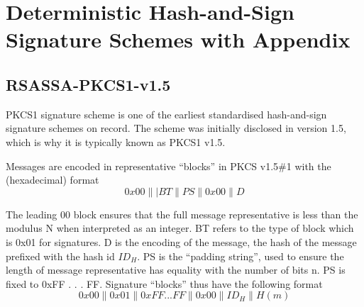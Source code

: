 \documentclass[]{final_report}
\theoremstyle{definition}
\begin{document}
\section{Deterministic Hash-and-Sign Signature Schemes with Appendix}

\subsection{RSASSA-PKCS1-v1.5}
PKCS1 signature scheme is one of the earliest standardised hash-and-sign signature schemes on record. The scheme was initially disclosed in version 1.5, which is why it is typically known as PKCS1 v1.5.

Messages are encoded in representative “blocks” in PKCS v1.5\#1 with the (hexadecimal) format
\[0x00\||BT\|PS\|0x00\|D\]

The leading 00 block ensures that the full message representative is less than the modulus N when interpreted as an integer. BT refers to the type of block which is 0x01 for signatures. D is the encoding of the message, the hash of the message prefixed with the hash id $ID_{H}$. PS is the “padding string”, used to ensure the length of message representative has equality with the number of bits n. PS is fixed to 0xFF . . . FF. Signature “blocks” thus have the following format
\[0x00\|0x01\|0xFF . . . FF\|0x00\|ID_{H}\|H(m)\]
\end{document}
